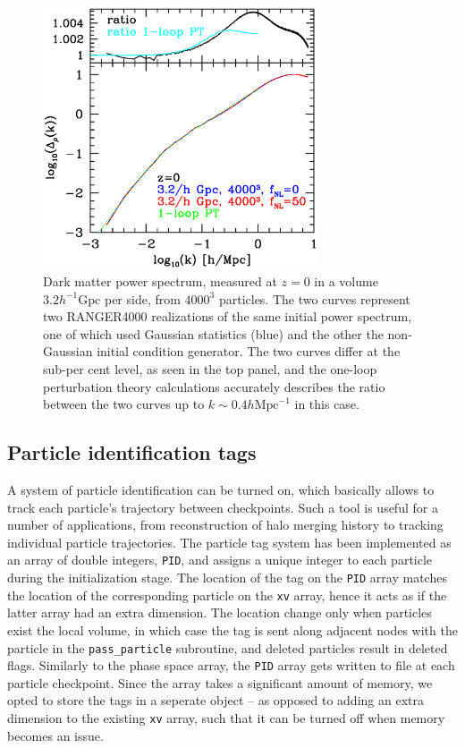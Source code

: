 \documentclass[useAMS,usenatbib]{mn2e}
\begin{document}
\begin{figure}%
  \begin{center}
    \includegraphics[width=3.2in]{graphs/dm_power_ngp_z0_fNL0_50_w_1loop_PT.eps}
  \caption{ Dark matter power spectrum, measured at $z=0$ in a volume $3.2 h^{-1}\mbox{Gpc}$ per side,
  from $4000^3$ particles. The two curves represent two RANGER4000 realizations of the same initial power spectrum, one of which used Gaussian statistics (blue) and the other the non-Gaussian initial condition generator. The two curves differ at the sub-per cent level, as seen in the top panel,
  and the one-loop perturbation theory calculations accurately describes the ratio between the two curves up to $k\sim 0.4h\mbox{Mpc}^{-1}$ in this case.   
    \label{fig:init}}
\end{center}
\end{figure}

\subsection{Particle identification tags}
\label{PID}

A system of particle identification can be turned on, which basically allows to track each particle's trajectory
between checkpoints. Such a tool is useful for a number of applications, from reconstruction of halo merging history to tracking individual particle
trajectories.
The particle tag system has been implemented as an array of double integers, {\tt PID}, 
and assigns a unique integer to each particle during the initialization stage. The location of the tag on the {\tt PID} array 
matches the location of the corresponding particle on the {\tt xv} array, hence it acts as if the latter array had an extra dimension.
The location change only when particles exist the local volume, in which case the tag is sent along adjacent nodes 
with the particle in the {\tt pass\_particle} subroutine, and deleted particles result in deleted flags.
Similarly to the phase space array, the {\tt PID} array gets written to file at each particle checkpoint.
Since the array takes a significant amount of memory, we opted to store the tags in a seperate object
-- as opposed to adding  an extra dimension to the existing {\tt xv} array, such that it can be turned off 
when memory becomes an issue.
 
\end{document}
